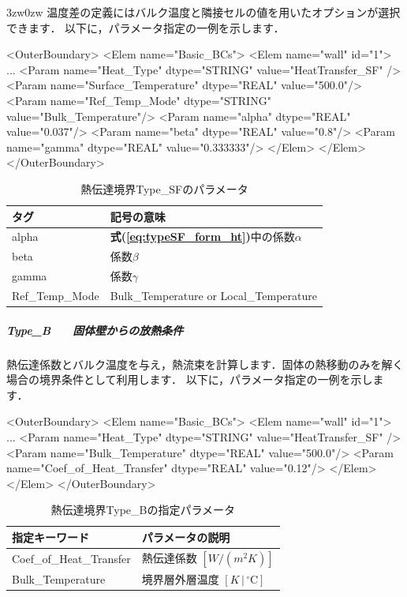 \begin{indentation}{3zw}{0zw}
温度差の定義にはバルク温度と隣接セルの値を用いたオプションが選択できます．
以下に，パラメータ指定の一例を示します．

{\small
\begin{program}
<OuterBoundary>
  <Elem name="Basic_BCs">
    <Elem name="wall" id="1">
      ...
      <Param name="Heat_Type"           dtype="STRING" value="HeatTransfer_SF" />
      <Param name="Surface_Temperature" dtype="REAL"   value="500.0"/>
      <Param name="Ref_Temp_Mode"       dtype="STRING" value="Bulk_Temperature"/>
      <Param name="alpha"               dtype="REAL"   value="0.037"/>
      <Param name="beta"                dtype="REAL"   value="0.8"/>
      <Param name="gamma"               dtype="REAL"   value="0.333333"/>
    </Elem>
  </Elem>
</OuterBoundary>
\end{program}
}

\begin{table}[htdp]
\caption{熱伝達境界Type\_SFのパラメータ}
\begin{center}
\small
\begin{tabular}{ll}\toprule
タグ & 記号の意味\\ \midrule
alpha & \textbf{式(\ref{eq:typeSF_form_ht})}中の係数$\alpha$\\
beta & 係数$\beta$\\
gamma & 係数$\gamma$\\
Ref\_Temp\_Mode & Bulk\_Temperature or Local\_Temperature\\ \bottomrule
\end{tabular}
\end{center}
\label{tbl:htsf}
\end{table}


%
\subparagraph{Type\_B　　固体壁からの放熱条件}
熱伝達係数とバルク温度を与え，熱流束を計算します．固体の熱移動のみを解く場合の境界条件として利用します．
以下に，パラメータ指定の一例を示します．

{\small
\begin{program}
<OuterBoundary>
  <Elem name="Basic_BCs">
    <Elem name="wall" id="1">
      ...
      <Param name="Heat_Type"             dtype="STRING" value="HeatTransfer_SF" />
      <Param name="Bulk_Temperature"      dtype="REAL"   value="500.0"/>
      <Param name="Coef_of_Heat_Transfer" dtype="REAL"   value="0.12"/>
    </Elem>
  </Elem>
</OuterBoundary>
\end{program}
}

\begin{table}[htdp]
\caption{熱伝達境界Type\_Bの指定パラメータ}
\begin{center}
\small
\begin{tabular}{ll} \toprule
指定キーワード & パラメータの説明\\ \midrule
Coef\_of\_Heat\_Transfer & 熱伝達係数 $[W/(m^2K)]$\\
Bulk\_Temperature & 境界層外層温度 $[K\,|\,{}^\circ\mathrm{C}]$\\
\bottomrule
\end{tabular}
\end{center}
\label{tbl:htb}
\end{table}

\end{indentation}


